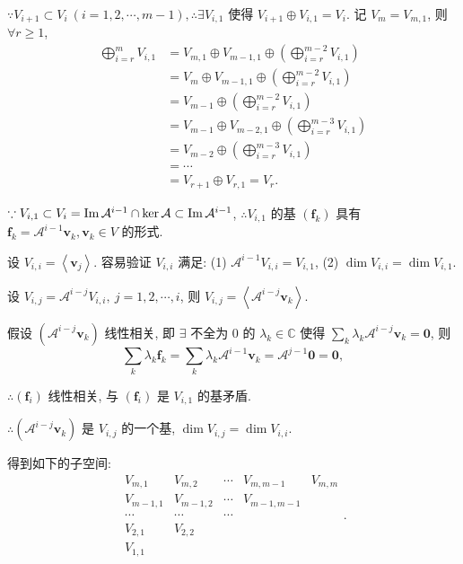 \documentclass[color=black,device=normal,lang=cn,mode=geye]{elegantnote}
\begin{document}
$\because V_{i+1}\subset V_i\ (i=1,2,\cdots,m-1),\therefore\exists V_{i,1}$ 使得 $V_{i+1}\oplus V_{i,1}=V_i$. 记 $V_m=V_{m,1}$, 则 $\forall r\geq1$,
\begin{equation}\label{eq4.7}
    \begin{aligned}
        \bigoplus\limits_{i=r}^mV_{i,1} & =V_{m,1}\oplus V_{m-1,1}\oplus\left(\bigoplus\limits_{i=r}^{m-2}V_{i,1}\right) \\
        & =V_m\oplus V_{m-1,1}\oplus\left(\bigoplus\limits_{i=r}^{m-2}V_{i,1}\right) \\
        & =V_{m-1}\oplus\left(\bigoplus\limits_{i=r}^{m-2}V_{i,1}\right) \\
        & =V_{m-1}\oplus V_{m-2,1}\oplus\left(\bigoplus\limits_{i=r}^{m-3}V_{i,1}\right) \\
        & =V_{m-2}\oplus\left(\bigoplus\limits_{i=r}^{m-3}V_{i,1}\right) \\
        & =\cdots \\
        & =V_{r+1}\oplus V_{r,1}=V_r.
    \end{aligned}
\end{equation}

$\because V_{i,1}\subset V_i=\operatorname{Im} \mathcal{A}^{i-1}\cap\ker\mathcal{A}\subset\operatorname{Im} \mathcal{A}^{i-1}$, $\therefore V_{i,1}$ 的基 $(\boldsymbol{f}_k)$ 具有 $\boldsymbol{f}_k=\mathcal{A}^{i-1}\boldsymbol{v}_k,\boldsymbol{v}_k\in V$ 的形式.

设 $V_{i,i}=\left<\boldsymbol{v}_j\right>$. 容易验证 $V_{i,i}$ 满足: (1) $\mathcal{A}^{i-1}V_{i,i}=V_{i,1}$, (2) $\dim V_{i,i}=\dim V_{i,1}$.

设 $V_{i,j}=\mathcal{A}^{i-j}V_{i,i},\ j=1,2,\cdots,i$, 则 $V_{i,j}=\left<\mathcal{A}^{i-j}\boldsymbol{v}_k\right>$.

假设 $(\mathcal{A}^{i-j}\boldsymbol{v}_k)$ 线性相关, 即 $\exists$ 不全为 $0$ 的 $\lambda_k\in\mathbb{C}$ 使得 $\sum\limits_k\lambda_k\mathcal{A}^{i-j}\boldsymbol{v}_k=\boldsymbol{0}$, 则
\[\sum\limits_k\lambda_k\boldsymbol{f}_k=\sum\limits_k\lambda_k\mathcal{A}^{i-1}\boldsymbol{v}_k=\mathcal{A}^{j-1}\boldsymbol{0}=\boldsymbol{0},\]

$\therefore(\boldsymbol{f}_i)$ 线性相关, 与 $(\boldsymbol{f}_i)$ 是 $V_{i,1}$ 的基矛盾.

$\therefore(\mathcal{A}^{i-j}\boldsymbol{v}_k)$ 是 $V_{i,j}$ 的一个基, $\dim V_{i,j}=\dim V_{i,i}$.

得到如下的子空间:
\begin{equation}\label{eq4.8}
    \begin{matrix}
        V_{m,1} & V_{m,2} & \cdots & V_{m,m-1} & V_{m,m} \\
        V_{m-1,1} & V_{m-1,2} & \cdots & V_{m-1,m-1} \\
        \cdots & \cdots & \cdots \\
        V_{2,1} & V_{2,2} \\
        V_{1,1}
    \end{matrix}.
\end{equation}
\end{document}
